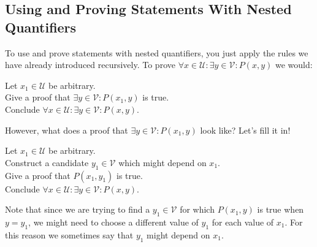 \subsection{Using and Proving Statements With Nested Quantifiers}

To use and prove statements with nested quantifiers, you just apply the rules we have already introduced recursively.  To prove $\forall x \in \mathcal{U}: \exists y \in \mathcal{V}: P(x,y)$ we would:

\begin{fitch*}
	\textrm{Let $x_1 \in \mathcal{U}$ be arbitrary.}\\
	\textrm{Give a proof that $\exists y \in \mathcal{V}: P(x_1,y)$ is true.}\\
	\textrm{Conclude $\forall x \in \mathcal{U}: \exists y \in \mathcal{V}: P(x,y)$.}
\end{fitch*} 

However, what does a proof that $\exists y \in \mathcal{V}: P(x_1,y)$ look like?  Let's fill it in!

\begin{fitch*}
	\textrm{Let $x_1 \in \mathcal{U}$ be arbitrary.}\\
	\textrm{Construct a candidate $y_1 \in \mathcal{V}$ which might depend on $x_1$. }\\
	\textrm{Give a proof that $P(x_1,y_1)$ is true.}\\
	\textrm{Conclude $\forall x \in \mathcal{U}: \exists y \in \mathcal{V}: P(x,y)$.}
\end{fitch*} 

Note that since we are trying to find a $y_1 \in \mathcal{V}$ for which $P(x_1,y)$ is true when $y = y_1$, we might need to choose a different value of $y_1$ for each value of $x_1$.  For this reason we sometimes say that $y_1$ might depend on $x_1$. 



